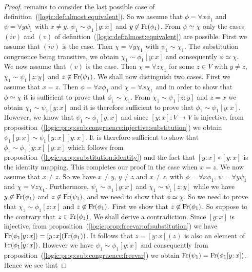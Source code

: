 \begin{proof}
remains to consider the last possible case of
definition~(\ref{logic:def:almost:equivalent}). So we assume that
$\phi=\forall x\phi_{1}$ and $\psi=\forall y\psi_{1}$ with $x\neq
y$, $\psi_{1}\sim\phi_{1}[y\!:\!x]$ and $y\not\in\mbox{\rm Fr}(\phi_{1})$.
From $\psi\simeq\chi$ only the cases $(iv)$ and $(v)$ of
definition~(\ref{logic:def:almost:equivalent}) are possible. First
we assume that $(iv)$ is the case. Then $\chi=\forall y\chi_{1}$
with $\psi_{1}\sim\chi_{1}$. The substitution congruence being
transitive, we obtain $\chi_{1}\sim\phi_{1}[y\!:\!x]$ and
consequently $\phi\simeq\chi$. We now assume that $(v)$ is the case.
Then $\chi=\forall z\chi_{1}$ for some $z\in V$ with $y\neq z$,
$\chi_{1}\sim\psi_{1}[z\!:\!y]$ and $z\not\in\mbox{\rm Fr}(\psi_{1})$. We
shall now distinguish two cases. First we assume that $x=z$. Then
$\phi=\forall x\phi_{1}$ and $\chi=\forall x\chi_{1}$ and in order
to show that $\phi\simeq\chi$ it is sufficient to prove that
$\phi_{1}\sim\chi_{1}$. From $\chi_{1}\sim\psi_{1}[z\!:\!y]$ and
$z=x$ we obtain $\chi_{1}\sim\psi_{1}[y\!:\!x]$ and it is therefore
sufficient to prove that $\phi_{1}\sim\psi_{1}[y\!:\!x]$. However,
we know that $\psi_{1}\sim\phi_{1}[y\!:\!x]$ and since
$[y\!:\!x]:V\to V$ is injective, from
proposition~(\ref{logic:prop:sub:congruence:injective:substitution})
we obtain $\psi_{1}[y\!:\!x]\sim\phi_{1}[y\!:\!x][y\!:\!x]$. It is
therefore sufficient to show that
$\phi_{1}\sim\phi_{1}[y\!:\!x][y\!:\!x]$ which follows from
proposition~(\ref{logic:prop:substitution:identity}) and the fact
that $[y\!:\!x]\circ[y\!:\!x]$ is the identity mapping. This
completes our proof in the case when $x=z$. We now assume that
$x\neq z$. So we have $x\neq y$, $y\neq z$ and $x\neq z$, with
$\phi=\forall x\phi_{1}$, $\psi=\forall y\psi_{1}$ and $\chi=\forall
z\chi_{1}$. Furthermore, $\psi_{1}\sim\phi_{1}[y\!:\!x]$ and
$\chi_{1}\sim\psi_{1}[z\!:\!y]$ while we have
$y\not\in\mbox{\rm Fr}(\phi_{1})$ and $z\not\in\mbox{\rm Fr}(\psi_{1})$, and we need
to show that $\phi\simeq\chi$. So we need to prove that
$\chi_{1}\sim\phi_{1}[z\!:\!x]$ and $z\not\in\mbox{\rm Fr}(\phi_{1})$. First
we show that $z\not\in\mbox{\rm Fr}(\phi_{1})$. So suppose to the contrary
that $z\in\mbox{\rm Fr}(\phi_{1})$. We shall derive a contradiction. Since
$[y\!:\!x]$ is injective, from
proposition~(\ref{logic:prop:freevar:of:substitution}) we have
$\mbox{\rm Fr}(\phi_{1}[y\!:\!x]) = [y\!:\!x](\mbox{\rm Fr}(\phi_{1}))$. It follows
that $z=[y\!:\!x](z)$ is also an element of
$\mbox{\rm Fr}(\phi_{1}[y\!:\!x])$. However we have
$\psi_{1}\sim\phi_{1}[y\!:\!x]$ and consequently from
proposition~(\ref{logic:prop:sub:congruence:freevar}) we obtain
$\mbox{\rm Fr}(\psi_{1})=\mbox{\rm Fr}(\phi_{1}[y\!:\!x])$. Hence we see that

\end{proof}
